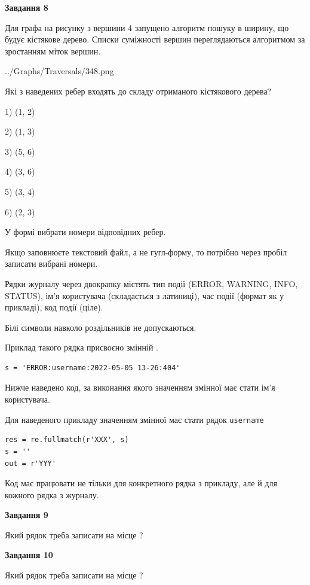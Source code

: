 \documentclass[12pt, ukrainian]{article}
\def\code#1{\Verb!#1!}
\begin{document}
{\begin {large}
{\begin {center}\textbf{Завдання 8}\end {center}}\par
Для графа на рисунку з вершини 4 запущено алгоритм пошуку в ширину, що будує кістякове дерево. Списки суміжності вершин переглядаються алгоритмом за зростанням міток вершин.\par
\begin{center}
	{../Graphs/Traversals/348.png}
\end{center}
\par Які з наведених ребер входять до складу отриманого кістякового дерева?\par
1) (1, 2)\par
2) (1, 3)\par
3) (5, 6)\par
4) (3, 6)\par
5) (3, 4)\par
6) (2, 3)\par
{\vskip 15pt} У формі вибрати номери відповідних ребер.


Якщо заповнюєте текстовий файл, а не гугл-форму, то потрібно через пробіл записа\-ти вибрані номери.\par
\newpage


Рядки журналу через двокрапку містять тип події (ERROR, WARNING, INFO, STATUS), ім'я користувача (складається з латиниці), час події (фор\-мат як у прикладі), код події (ціле).

Білі символи навколо роздільників не допускаються.

Приклад такого рядка присвоєно змінній .



\begin{verbatim}
s = 'ERROR:username:2022-05-05 13-26:404'
\end{verbatim}


Нижче наведено код, за виконання якого значенням змінної  має стати ім'я користувача.

Для наведеного прикладу значенням змінної  має стати рядок \code{username}



\begin{verbatim}
res = re.fullmatch(r'XXX', s)
s = ''
out = r'YYY'
\end{verbatim}


Код має працювати не тільки для конкретного рядка з прикладу, але й для кожного рядка з журналу.

{\begin {center}\textbf{Завдання 9}\end {center}}\par
Який рядок треба записати на місце  ?\par
\vspace{5mm}


{\begin {center}\textbf{Завдання 10}\end {center}}\par
Який рядок треба записати на місце  ?\par


\newpage


\end {large}}
\end{document}
